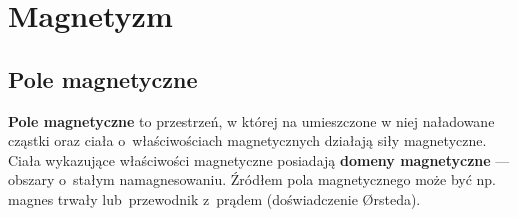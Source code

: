 \chapter{Magnetyzm}
  \section{Pole magnetyczne}
    \begin{definition}
      \textbf{Pole magnetyczne} to przestrzeń, w której na umieszczone w niej naładowane cząstki oraz ciała o~właściwościach magnetycznych działają siły magnetyczne. Ciała wykazujące właściwości magnetyczne posiadają \textbf{domeny magnetyczne} --- obszary o~stałym namagnesowaniu. Źródłem pola magnetycznego może być np. magnes trwały lub~przewodnik z~prądem (doświadczenie Ørsteda).
    \end{definition}

